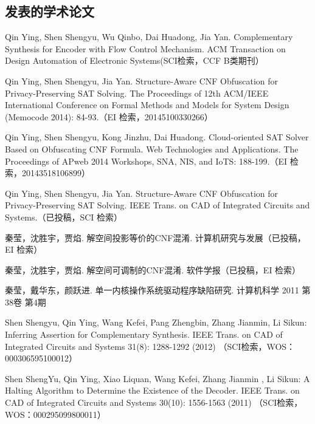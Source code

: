 \begin{resume}

  \section*{发表的学术论文} %

  \begin{enumerate}[{[}1{]}]
  \addtolength{\itemsep}{-.36\baselineskip}%
  \item Qin Ying, Shen Shengyu, Wu Qinbo, Dai Huadong, Jia Yan. Complementary Synthesis for Encoder with Flow Control Mechanism. ACM Transaction on Design Automation of Electronic Systems(SCI检索，CCF B类期刊）
  \item Qin Ying, Shen Shengyu, Jia Yan. Structure-Aware CNF Obfuscation for Privacy-Preserving SAT Solving. The Proceedings of 12th ACM/IEEE International Conference on Formal Methods and Models for System Design (Memocode 2014): 84-93.（EI 检索，20145100330266）
  \item Qin Ying, Shen Shengyu, Kong Jinzhu, Dai Huadong. Cloud-oriented SAT Solver Based on Obfuscating CNF Formula. Web Technologies and Applications. The Proceedings of APweb 2014 Workshops, SNA, NIS, and IoTS: 188-199.（EI 检索，20143518106899）
  \item Qin Ying, Shen Shengyu, Jia Yan. Structure-Aware CNF Obfuscation for Privacy-Preserving SAT Solving.
      IEEE Trans. on CAD of Integrated Circuits and Systems.（已投稿，SCI 检索）
  \item 秦莹，沈胜宇，贾焰. 解空间投影等价的CNF混淆. 计算机研究与发展（已投稿，EI 检索）
  \item 秦莹，沈胜宇，贾焰. 解空间可调制的CNF混淆. 软件学报（已投稿，EI 检索）
  \item 秦莹，戴华东，颜跃进. 单一内核操作系统驱动程序缺陷研究. 计算机科学 2011 第38卷 第4期
  \item Shen Shengyu, Qin Ying, Wang Kefei, Pang Zhengbin, Zhang Jianmin, Li Sikun: Inferring Assertion for Complementary Synthesis. IEEE Trans. on CAD of Integrated Circuits and Systems 31(8): 1288-1292 (2012) （SCI检索，WOS：000306595100012）
  \item Shen ShengYu, Qin Ying, Xiao Liquan, Wang Kefei, Zhang Jianmin , Li Sikun: A Halting Algorithm to Determine the Existence of the Decoder. IEEE Trans. on CAD of Integrated Circuits and Systems 30(10): 1556-1563 (2011) （SCI检索，WOS：000295099800011）

\end{enumerate}
\end{resume}
